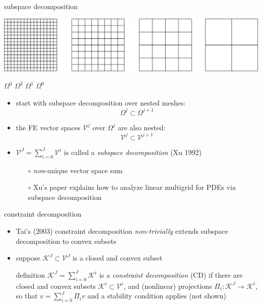 \documentclass[svgnames,
               hyperref={colorlinks,citecolor=DeepPink4,linkcolor=FireBrick,urlcolor=Maroon},
               usepdftitle=false]  %
               {beamer}
\newcommand{\ds}{\displaystyle}
\begin{document}
\newcommand{\cK}{\mathcal{K}}

\begin{frame}{subspace decomposition}

\hfill \includegraphics[height=0.12\textheight]{../talk-oxford/images/mg-grids.png}

{\footnotesize
\hfill $\Omega^3$ \hspace{8.5mm} $\Omega^2$ \hspace{8.5mm} $\Omega^1$ \hspace{8.5mm} $\Omega^0$ \hspace{1mm}
}

\begin{itemize}
\item start with subspace decomposition over nested meshes:
    $$\Omega^j \subset \Omega^{j+1}$$
\item the FE vector spaces $\mathcal{V}^j$ over $\Omega^j$ are also nested:
    $$\mathcal{V}^j \subset \mathcal{V}^{j+1}$$
\item $\mathcal{V}^J = \sum_{i=0}^J \mathcal{V}^i$ is called a \emph{subspace decomposition} (Xu 1992)

    \begin{itemize}
    \item[$\circ$] \emph{non}-unique vector space sum
    \item[$\circ$] Xu's paper explains how to analyze linear multigrid for PDEs via subspace decomposition
    \end{itemize}
\end{itemize}
\end{frame}


\begin{frame}{constraint decomposition}

\begin{itemize}
\item Tai's (2003) constraint decomposition \emph{non-trivially} extends subspace decomposition to convex subsets
\item suppose $\mathcal{K}^J \subset \mathcal{V}^J$ is a closed and convex subset
\begin{block}{definition}
$\ds \mathcal{K}^J = \sum_{i=0}^J \mathcal{K}^i$ \quad is a \emph{constraint decomposition} (CD) if there are closed and convex subsets $\mathcal{K}^i\subset \mathcal{V}^i$, and (nonlinear) projections $\Pi_i : \mathcal{K}^J \to \mathcal{K}^i$, so that $\ds v = \sum_{i=0}^J \Pi_i v$ and a stability condition applies (not shown)
\end{block}
\end{itemize}
\end{frame}
\end{document}
